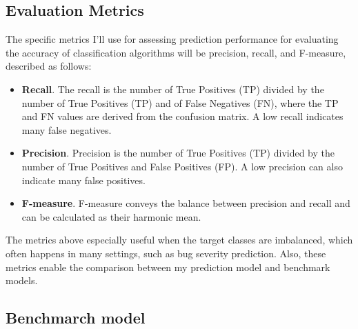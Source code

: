 \documentclass[a4paper]{article}
\begin{document}
\subsection{Evaluation Metrics}
The specific metrics I'll use for assessing prediction performance for evaluating the accuracy of classification algorithms will be precision, recall, and F-measure, described as follows\cite{Kuhn:2013}:

\begin{itemize}
\item \textbf{Recall}. The recall is the number of True Positives (TP) divided by the number of True Positives (TP) and of False Negatives (FN), where the TP and FN values are derived from the confusion matrix. A low recall indicates many false negatives.

\item \textbf{Precision}. Precision is the number of True Positives (TP) divided by the number of True Positives and False Positives (FP). A low precision can also indicate many false positives.

\item \textbf{F-measure}. F-measure conveys the balance between precision and recall and can be calculated as their harmonic mean. 
\end{itemize}

The metrics above especially useful when the target classes are imbalanced, which often happens in many settings, such as bug severity prediction. Also, these metrics enable the comparison between my prediction model and benchmark models.

\subsection{Benchmarch model}
\end{document}
